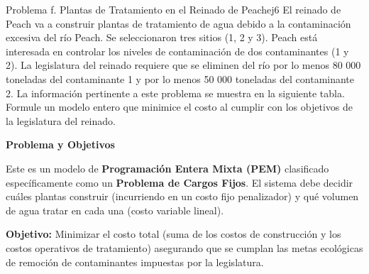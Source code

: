 \documentclass[10pt,a4paper]{article}
\begin{document}
\newpage

\begin{ejercicio}{Problema f. Plantas de Tratamiento en el Reinado de Peach}{ej6}
El reinado de Peach va a construir plantas de tratamiento de agua debido a la contaminación excesiva del río Peach. Se seleccionaron tres sitios (1, 2 y 3). Peach está interesada en controlar los niveles de contaminación de dos contaminantes (1 y 2). La legislatura del reinado requiere que se eliminen del río por lo menos 80 000 toneladas del contaminante 1 y por lo menos 50 000 toneladas del contaminante 2. La información pertinente a este problema se muestra en la siguiente tabla. Formule un modelo entero que minimice el costo al cumplir con los objetivos de la legislatura del reinado.

\begin{center}
\end{center}
\end{ejercicio}

\vspace{3mm}
\textbf{Problema y Objetivos}

Este es un modelo de \textbf{Programación Entera Mixta (PEM)} clasificado específicamente como un \textbf{Problema de Cargos Fijos}. El sistema debe decidir cuáles plantas construir (incurriendo en un costo fijo penalizador) y qué volumen de agua tratar en cada una (costo variable lineal).

\textbf{Objetivo:} Minimizar el costo total (suma de los costos de construcción y los costos operativos de tratamiento) asegurando que se cumplan las metas ecológicas de remoción de contaminantes impuestas por la legislatura.

\vspace{3mm}
\end{document}
